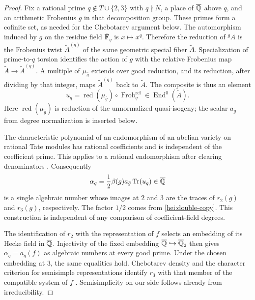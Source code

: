 \begin{proof}
Fix a rational prime $q\notin T\cup\{2,3\}$ with $q\nmid N$,
a place of $\overline{\mathbb Q}$ above $q$, and an arithmetic Frobenius
$g$ in that decomposition group.  These primes form a cofinite set,
as needed for the Chebotarev argument below.  The automorphism induced
by $g$ on the residue field $\overline{\mathbf F}_q$ is $x\mapsto x^q$.
Therefore the reduction of
\({}^gA\) is the Frobenius twist $\widetilde A^{(q)}$ of the same
geometric special fiber $\widetilde A$.  Specialization of
prime-to-$q$ torsion identifies the action of $g$ with the relative
Frobenius map $\widetilde A\to\widetilde A^{(q)}$.  A multiple of
$\mu_{\bar g}$ extends over good reduction, and its reduction, after
dividing by that integer, maps $\widetilde A^{(q)}$ back to
$\widetilde A$.  The composite is thus an element
\[
       u_q=\operatorname{red}(\mu_{\bar g})\circ
                    \operatorname{Frob}^{\mathrm{rel}}_q
                    \in\operatorname{End}^0(\widetilde A).
\]
Here $\operatorname{red}(\mu_{\bar g})$ is reduction of the
unnormalized quasi-isogeny; the scalar $a_{\bar g}$ from degree
normalization is inserted below.

The characteristic polynomial of an endomorphism of an abelian
variety on rational Tate modules has rational coefficients and is
independent of the coefficient prime.  This applies to a rational
endomorphism after clearing denominators
\cite[I, Theorem 10.9 and Proposition 10.20]{MilneAV2008}.
Consequently
\[
       \alpha_q=\frac12\beta(g)a_{\bar g}\operatorname{Tr}(u_q)
                         \in\overline{\mathbb Q}
\]
is a single algebraic number whose images at $2$ and $3$ are the
traces of $r_2(g)$ and $r_3(g)$, respectively.  The factor $1/2$
comes from \eqref{hei:double-copy}.  This construction is independent
of any comparison of coefficient-field degrees.

The identification of $r_2$ with the representation of $f$ selects
an embedding of its Hecke field in $\overline{\mathbb Q}$.  Injectivity of
the fixed embedding $\overline{\mathbb Q}\hookrightarrow\overline{\mathbb Q}_2$
then gives $\alpha_q=a_q(f)$ as algebraic numbers at every good
prime.  Under the chosen embedding at $3$, the same equalities
hold.  Chebotarev density and the character criterion for semisimple
representations \cite[IV, Theorem~3.3 and Lemma~3.9]{MilneAV2008}
identify $r_3$ with that member of the compatible system of $f$
\cite{Deligne1971Modular}.  Semisimplicity on our side follows already
from irreducibility.
\end{proof}

